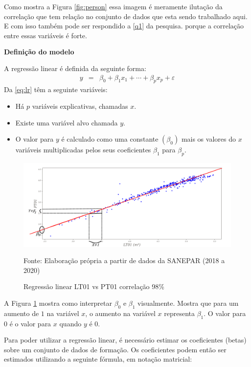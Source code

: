 Como mostra a Figura \ref{fig:person} essa imagem é meramente ilutação da correlação que tem relação no conjunto de dados que esta sendo trabalhado aqui. E com isso também pode ser respondido a \ref{q1} da pesquisa. porque a correlação entre essas variáveis é forte.

\textbf{Definição do modelo}

A regressão linear é definida da seguinte forma:
\begin{eqnarray}
y&=&\beta_0+\beta_1 x_1+\cdots+\beta_p x_p+\varepsilon\label{eq:lr}
\end{eqnarray}
Da \eqref{eq:lr} têm a seguinte variáveis:

\begin{itemize}
	\item  Há $p$ variáveis explicativas, chamadas $x$.
\item Existe uma variável alvo chamada $y$.
\item  O valor para $y$ é calculado como uma constante $\left(\beta_0\right)$ mais os valores do $x$ variáveis multiplicadas pelos seus coeficientes $\beta_1$ para $\beta_p$.
\end{itemize}

\begin{figure}[H]
	\centering
	\caption{Regressão linear LT01 vs PT01 correlação 98\%}
	\label{fig:lr-lt01-m3}
	\includegraphics[width=1\linewidth]{"Modelos/Figuras/LR LT01 (m³)"}
	
	Fonte: Elaboração própria a partir de dados da SANEPAR (2018 a 2020)
\end{figure}



A Figura \ref{fig:lr-lt01-m3} mostra como interpretar $\beta_0$ e $\beta_1$ visualmente. Mostra que para um aumento de $1$ na variável $x$, o aumento na variável $x$ representa $\beta_1$. O valor para $0$ é o valor para $x$ quando $y$ é $0$.

Para poder utilizar a regressão linear, é necessário estimar os coeficientes (betas) sobre um conjunto de dados de formação. Os coeficientes podem então ser estimados utilizando a seguinte fórmula, em notação matricial:

